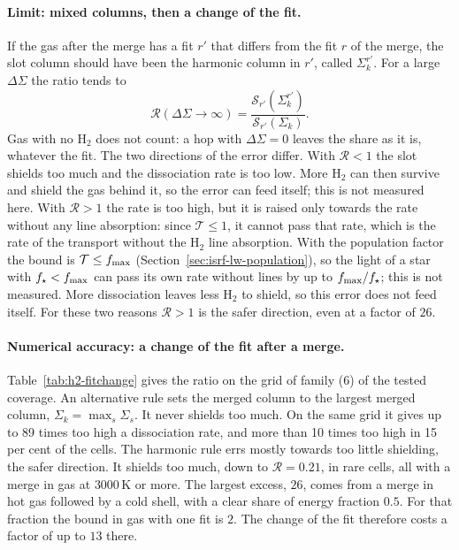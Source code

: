 \paragraph{Limit: mixed columns, then a change of the fit.} If the gas after
the merge has a fit $r'$ that differs from the fit $r$ of the merge, the slot
column should have been the harmonic column in $r'$, called $\Sigma_k^{r'}$.
For a large $\Delta\Sigma$ the ratio tends to
\begin{equation}
  \mathcal R(\Delta\Sigma\to\infty)=\frac{\mathcal S_{r'}(\Sigma_k^{r'})}{\mathcal S_{r'}(\Sigma_k)}.
  \label{eq:h2-fitchange}
\end{equation}
Gas with no H$_2$ does not count: a hop with $\Delta\Sigma=0$ leaves the share
as it is, whatever the fit. The two directions of the error differ. With
$\mathcal R<1$ the slot shields too much and the dissociation rate is too low.
More H$_2$ can then survive and shield the gas behind it, so the error can
feed itself; this is not measured here. With $\mathcal R>1$ the rate is too
high, but it is raised only towards the rate without any line absorption: since
$\mathcal T\le1$, it cannot pass that rate, which is the rate of the transport
without the H$_2$ line absorption. With the population factor the bound is
$\mathcal T\le f_{\rm max}$ (Section~\ref{sec:isrf-lw-population}), so the
light of a star with $f_\star<f_{\rm max}$ can pass its own rate without lines
by up to $f_{\rm max}/f_\star$; this is not measured. More dissociation leaves less H$_2$ to
shield, so this error does not feed itself. For these two reasons
$\mathcal R>1$ is the safer direction, even at a factor of $26$.

\paragraph{Numerical accuracy: a change of the fit after a merge.}
Table~\ref{tab:h2-fitchange} gives the ratio on the grid of family (6) of the
tested coverage.
An alternative rule sets the merged column to the largest merged column,
$\Sigma_k=\max_s\Sigma_s$. It never shields too much. On the same grid it
gives up to 89 times too high a dissociation rate, and more than 10 times too
high in 15 per cent of the cells. The harmonic rule errs mostly towards too
little shielding, the safer direction. It shields too much, down to $\mathcal R=0.21$, in rare cells, all
with a merge in gas at $3000$\,K or more. The largest excess, $26$, comes from
a merge in hot gas followed by a cold shell, with a clear share of energy
fraction $0.5$. For that fraction the bound in gas with one fit is $2$. The
change of the fit therefore costs a factor of up to $13$ there.

